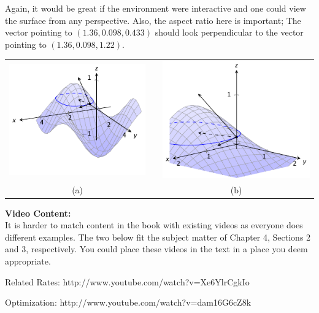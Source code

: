\documentclass[10pt]{article}
\begin{document}
Again, it would be great if the environment were interactive and one could view the surface from any perspective. Also, the aspect ratio here is important; The vector pointing to $(1.36,0.098,0.433)$ should look perpendicular to the vector pointing to $(1.36,0.098, 1.22)$.

\begin{tabular}{ccc}
\includegraphics[scale=1.5,trim = 0mm 5mm 0mm 0mm,clip]{figures/figdirect2}& & \includegraphics[scale=1.5]{figures/figdirect2b}\\
(a)&\quad  & (b)\\
\end{tabular}


\textbf{Video Content:}\\

It is harder to match content in the book with existing videos as everyone does different examples. The two below fit the subject matter of Chapter 4, Sections 2 and 3, respectively. You could place these videos in the text in a place you deem appropriate.

Related Rates: http://www.youtube.com/watch?v=Xe6YlrCgkIo

Optimization: http://www.youtube.com/watch?v=dam16G6cZ8k
\end{document}
